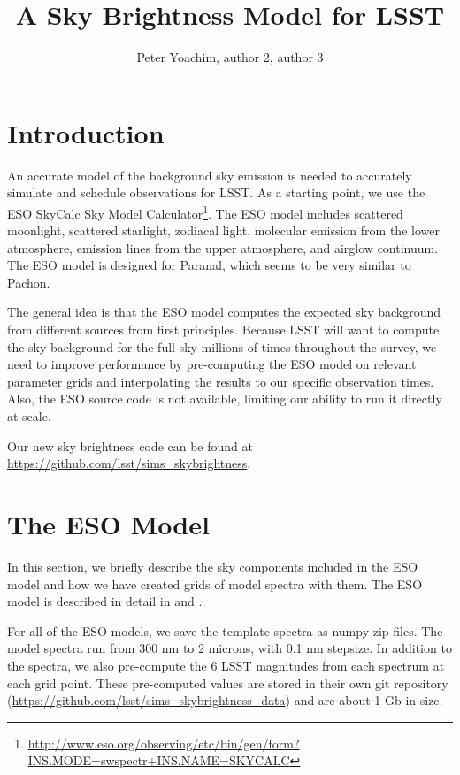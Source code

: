 \documentclass{emulateapj}  %
\begin{document}
\title{A Sky Brightness Model for LSST}


\author{Peter Yoachim, author 2, author 3}




\section{Introduction}

An accurate model of the background sky emission is needed to accurately simulate and schedule observations for LSST.  As a starting point, we use the ESO SkyCalc Sky Model Calculator\footnote{\url{http://www.eso.org/observing/etc/bin/gen/form?} \url{INS.MODE=swspectr+INS.NAME=SKYCALC}}.  The ESO model includes scattered moonlight, scattered starlight, zodiacal light, molecular emission from the lower atmosphere, emission lines from the upper atmosphere, and airglow continuum.  The ESO model is designed for Paranal, which seems to be very similar to Pachon.  

The general idea is that the ESO model computes the expected sky background from different sources from first principles. Because LSST will want to compute the sky background for the full sky millions of times throughout the survey, we need to improve performance by pre-computing the ESO model on relevant parameter grids and interpolating the results to our specific observation times. Also, the ESO source code is not available, limiting our ability to run it directly at scale.

Our new sky brightness code can be found at \url{https://github.com/lsst/sims\_skybrightness}.

\section{The ESO Model}
In this section, we briefly describe the sky components included in the ESO model and how we have created grids of model spectra with them. The ESO model is described in detail in \citet{Noll12} and \citet{Jones13}.

For all of the ESO models, we save the template spectra as numpy zip files.  The model spectra run from 300 nm to 2 microns, with 0.1 nm stepsize.  In addition to the spectra, we also pre-compute the 6 LSST magnitudes from each spectrum at each grid point. These pre-computed values are stored in their own git repository (\url{https://github.com/lsst/sims\_skybrightness\_data}) and are about 1 Gb in size.
\end{document}
